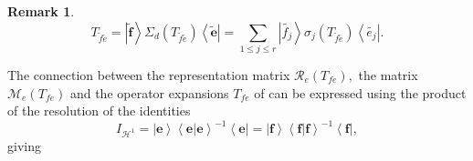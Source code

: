 \documentclass[aps,preprint]{revtex4}%
\newtheorem{remark}[theorem]{Remark}
\begin{document}
\begin{remark}%
\begin{equation}
T_{\widetilde{f}\widetilde{e}}=\left\vert \widetilde{\mathbf{f}}\right\rangle
\Sigma_{d}\left(  T_{\widetilde{f}\widetilde{e}}\right)  \left\langle
\widetilde{\mathbf{e}}\right\vert =\sum_{1\leq j\leq r}\left\vert
\widetilde{f_{j}}\right\rangle \sigma_{j}\left(  T_{\widetilde{f}%
\widetilde{e}}\right)  \left\langle \widetilde{e_{j}}\right\vert .
\end{equation}

\end{remark}

The connection between the representation matrix $\mathcal{R}_{e}\left(
T_{fe}\right)  ,$ the matrix $\mathcal{M}_{e}\left(  T_{fe}\right)  $ and the
operator expansions $T_{fe}$ of can be expressed using the product of the
resolution of the identities
\begin{equation}
I_{\mathcal{H}^{1}}=\left\vert \mathbf{e}\right\rangle \left\langle \left.
\mathbf{e}\right\vert \mathbf{e}\right\rangle ^{-1}\left\langle \mathbf{e}%
\right\vert =\left\vert \mathbf{f}\right\rangle \left\langle \left.
\mathbf{f}\right\vert \mathbf{f}\right\rangle ^{-1}\left\langle \mathbf{f}%
\right\vert ,
\end{equation}
giving
\end{document}

